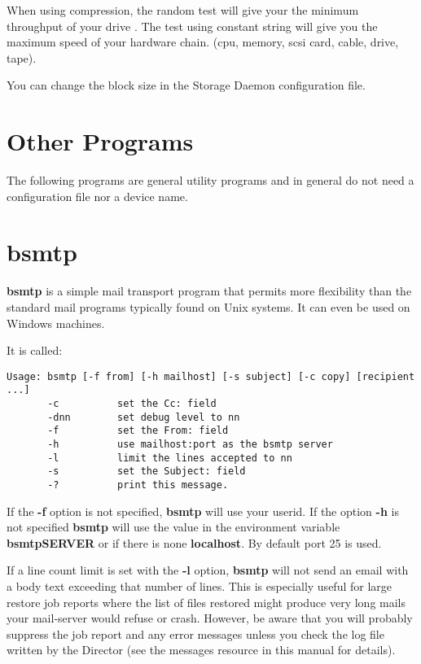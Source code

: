 When using compression, the random test will give your the minimum throughput
of your drive . The test using constant string will give you the maximum speed
of your hardware chain. (cpu, memory, scsi card, cable, drive, tape).

You can change the block size in the Storage Daemon configuration file.

\section{Other Programs}

The following programs are general utility programs and in general do not need
a configuration file nor a device name.

\section{bsmtp}
\label{bsmtp}

{\bf bsmtp} is a simple mail transport program that permits more flexibility
than the standard mail programs typically found on Unix systems. It can even
be used on Windows machines.

It is called:

\footnotesize
\begin{verbatim}
Usage: bsmtp [-f from] [-h mailhost] [-s subject] [-c copy] [recipient ...]
       -c          set the Cc: field
       -dnn        set debug level to nn
       -f          set the From: field
       -h          use mailhost:port as the bsmtp server
       -l          limit the lines accepted to nn
       -s          set the Subject: field
       -?          print this message.
\end{verbatim}
\normalsize

If the {\bf -f} option is not specified, {\bf bsmtp} will use your userid. If
the option {\bf -h} is not specified {\bf bsmtp} will use the value in the environment
variable {\bf bsmtpSERVER} or if there is none {\bf localhost}. By default
port 25 is used.

If a line count limit is set with the {\bf -l} option, {\bf bsmtp} will
not send an email with a body text exceeding that number of lines. This
is especially useful for large restore job reports where the list of
files restored might produce very long mails your mail-server would
refuse or crash. However, be aware that you will probably suppress the
job report and any error messages unless you check the log file written
by the Director (see the messages resource in this manual for details).


